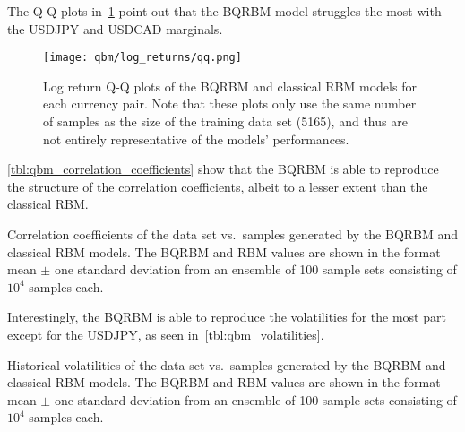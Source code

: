 The Q-Q plots in~\cref{fig:qbm_log_returns_qq} point out that the BQRBM model struggles the most with the USDJPY and USDCAD marginals.
\begin{figure}[!htb]
    \begin{center}
        \texttt{[image: qbm/log\_returns/qq.png]}
    \end{center}
    \caption{Log return Q-Q plots of the BQRBM and classical RBM models for each currency pair. Note that these plots only use the same number of samples as the size of the training data set (5165), and thus are not entirely representative of the models' performances.}
    \label{fig:qbm_log_returns_qq}
\end{figure}

\cref{tbl:qbm_correlation_coefficients} show that the BQRBM is able to reproduce the structure of the correlation coefficients, albeit to a lesser extent than the classical RBM.
\begin{table}[!htb]
    \centering
    \begin{adjustbox}{max width=\textwidth}
        
    \end{adjustbox}
    \caption{Correlation coefficients of the data set vs.~samples generated by the BQRBM and classical RBM models. The BQRBM and RBM values are shown in the format mean \(\pm\) one standard deviation from an ensemble of 100 sample sets consisting of \( 10^4 \) samples each.}
    \label{tbl:qbm_correlation_coefficients}
\end{table}

Interestingly, the BQRBM is able to reproduce the volatilities for the most part except for the USDJPY, as seen in~\cref{tbl:qbm_volatilities}.
\begin{table}[!htb]
    \centering
    \begin{adjustbox}{max width=\textwidth}
        
    \end{adjustbox}
    \caption{
        Historical volatilities of the data set vs.~samples generated by the BQRBM and classical RBM models.
        The BQRBM and RBM values are shown in the format mean \(\pm\) one standard deviation from an ensemble of 100 sample sets consisting of \( 10^4 \) samples each.
    }
    \label{tbl:qbm_volatilities}
\end{table}

